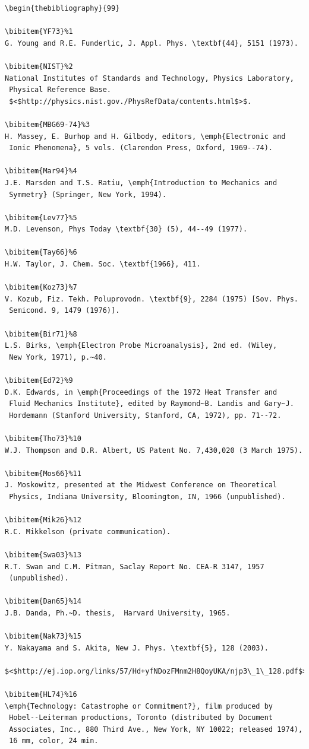 \documentclass[]{interact}
\theoremstyle{plain}%
\theoremstyle{definition}
\theoremstyle{remark}
\begin{document}
\begin{verbatim}
\begin{thebibliography}{99}

\bibitem{YF73}%1
G. Young and R.E. Funderlic, J. Appl. Phys. \textbf{44}, 5151 (1973).

\bibitem{NIST}%2
National Institutes of Standards and Technology, Physics Laboratory,
 Physical Reference Base.
 $<$http://physics.nist.gov./PhysRefData/contents.html$>$.

\bibitem{MBG69-74}%3
H. Massey, E. Burhop and H. Gilbody, editors, \emph{Electronic and
 Ionic Phenomena}, 5 vols. (Clarendon Press, Oxford, 1969--74).

\bibitem{Mar94}%4
J.E. Marsden and T.S. Ratiu, \emph{Introduction to Mechanics and
 Symmetry} (Springer, New York, 1994).

\bibitem{Lev77}%5
M.D. Levenson, Phys Today \textbf{30} (5), 44--49 (1977).

\bibitem{Tay66}%6
H.W. Taylor, J. Chem. Soc. \textbf{1966}, 411.

\bibitem{Koz73}%7
V. Kozub, Fiz. Tekh. Poluprovodn. \textbf{9}, 2284 (1975) [Sov. Phys.
 Semicond. 9, 1479 (1976)].

\bibitem{Bir71}%8
L.S. Birks, \emph{Electron Probe Microanalysis}, 2nd ed. (Wiley,
 New York, 1971), p.~40.

\bibitem{Ed72}%9
D.K. Edwards, in \emph{Proceedings of the 1972 Heat Transfer and
 Fluid Mechanics Institute}, edited by Raymond~B. Landis and Gary~J.
 Hordemann (Stanford University, Stanford, CA, 1972), pp. 71--72.

\bibitem{Tho73}%10
W.J. Thompson and D.R. Albert, US Patent No. 7,430,020 (3 March 1975).

\bibitem{Mos66}%11
J. Moskowitz, presented at the Midwest Conference on Theoretical
 Physics, Indiana University, Bloomington, IN, 1966 (unpublished).

\bibitem{Mik26}%12
R.C. Mikkelson (private communication).

\bibitem{Swa03}%13
R.T. Swan and C.M. Pitman, Saclay Report No. CEA-R 3147, 1957
 (unpublished).

\bibitem{Dan65}%14
J.B. Danda, Ph.~D. thesis,  Harvard University, 1965.

\bibitem{Nak73}%15
Y. Nakayama and S. Akita, New J. Phys. \textbf{5}, 128 (2003).
 $<$http://ej.iop.org/links/57/Hd+yfNDozFMnm2H8QoyUKA/njp3\_1\_128.pdf$>$.

\bibitem{HL74}%16
\emph{Technology: Catastrophe or Commitment?}, film produced by
 Hobel--Leiterman productions, Toronto (distributed by Document
 Associates, Inc., 880 Third Ave., New York, NY 10022; released 1974),
 16 mm, color, 24 min.


\end{verbatim}
\end{document}
